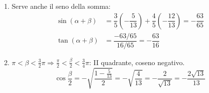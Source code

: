 \begin{question}[ID=1.2, subtitle={Formule di addizione con $\cos\alpha=4/5$ e $\cos\beta=-5/13$}, tags={goniometria, formule di addizione}, difficulty=media]
\begin{explanation}
\begin{enumerate}
    \item Serve anche il seno della somma:
    \[\begin{aligned}
    \sin(\alpha+\beta) &= \dfrac35\left(-\dfrac5{13}\right)+\dfrac45\left(-\dfrac{12}{13}\right)=-\dfrac{63}{65}\\
    \tan(\alpha+\beta) &= \dfrac{-63/65}{16/65}=-\dfrac{63}{16}
    \end{aligned}\]
    \item $\pi<\beta<\tfrac32\pi \Rightarrow \tfrac\pi2<\tfrac\beta2<\tfrac34\pi$: II quadrante, coseno negativo.
    \[ \cos\dfrac\beta2=-\sqrt{\dfrac{1-\frac5{13}}{2}}=-\sqrt{\dfrac{4}{13}}=-\dfrac{2}{\sqrt{13}}=-\dfrac{2\sqrt{13}}{13} \]
\end{enumerate}
\end{explanation}
\end{question}


